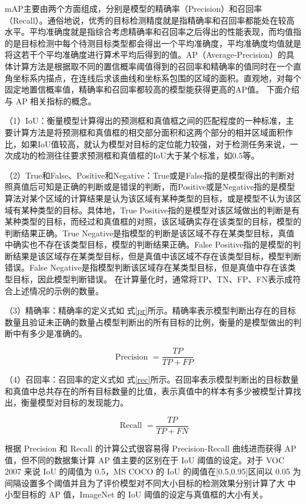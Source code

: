 mAP主要由两个方面组成，分别是模型的精确率（Precision）和召回率（Recall）。通俗地说，优秀的目标检测精度就是指精确率和召回率都能处在较高水平。平均准确度就是指综合考虑精确率和召回率之后得出的性能表现，而均值指的是目标检测中每个待测目标类型都会得出一个平均准确度，平均准确度均值就是将这若干个平均准确度进行算术平均后得到的值。AP（Average-Precision）的具体计算方法是根据取不同的置信概率阈值得到的召回率和精确率的值同时在一个直角坐标系内描点，在连线后求该曲线和坐标系包围的区域的面积。直观地，对每个固定地置信概率值，精确率和召回率都较高的模型能获得更高的AP值。
下面介绍与 AP 相关指标的概念。

（1）IoU：衡量模型计算得出的预测框和真值框之间的匹配程度的一种标准，主要计算方法是将预测框和真值框的相交部分面积和这两个部分的相并区域面积作比，如果IoU值较高，就认为模型对目标的定位能力较强，对于检测任务来说，一次成功的检测往往要求预测框和真值框的IoU大于某个标准，如$0.5$等。

（2）True和False、Positive和Negative：True或是False指的是模型得出的判断对照真值后可知是正确的判断或是错误的判断，而Positive或是Negative指的是模型算法对某个区域的计算结果是认为该区域有某种类型的目标，或是模型不认为该区域有某种类型的目标。具体地，True Positive指的是模型对该区域做出的判断是有某种类型的目标，而经过和真值框的对照，该区域确实存在该类型的目标，模型的判断结果正确。True Negative是指模型的判断是该区域不存在某类型目标，真值中确实也不存在该类型目标，模型的判断结果正确。False Positive指的是模型的判断结果是该区域存在某类型目标，但是真值中该区域不存在该类型目标，模型判断错误。False Negative是指模型判断该区域存在某类型目标，但是真值中存在该类型目标，因此模型判断错误。
在计算量化时，通常将TP、TN、FP、FN表示成符合上述情况的示例的数量。

（3）精确率：精确率的定义式如
式\ref{pr}所示。精确率表示模型判断出存在的目标数量且验证未正确的数量占模型判断出的所有目标的比例，衡量的是模型做出的判断中有多少是准确的。

\begin{equation}
     \text { Precision }=\frac{T P}{T P+F P}
    \label{pr}
\end{equation}

（4）召回率：召回率的定义式如
式\ref{rec}所示。召回率表示模型判断出的目标数量和真值中总共存在的所有目标数量的比值，表示真值中的样本有多少被模型计算找出，衡量模型对目标的发现能力。

\begin{equation}
     \text { Recall }=\frac{T P}{T P+F N}
    \label{rec}
\end{equation}

根据 Precision 和 Recall 的计算公式很容易得 Precision-Recall 曲线进而获得
AP 值，但不同的数据集计算 AP 值主要的区别在于 IoU 阈值的设定。对于 VOC
2007 来说 IoU 的阈值为 0.5，MS COCO 的 IoU 的阈值在[0.5,0.95]区间以 0.05 为
间隔设置多个阈值并且为了评价模型对不同大小目标的检测效果分别计算了大
中小型目标的 AP 值，ImageNet 的 IoU 阈值的设定与真值框的大小有关。

